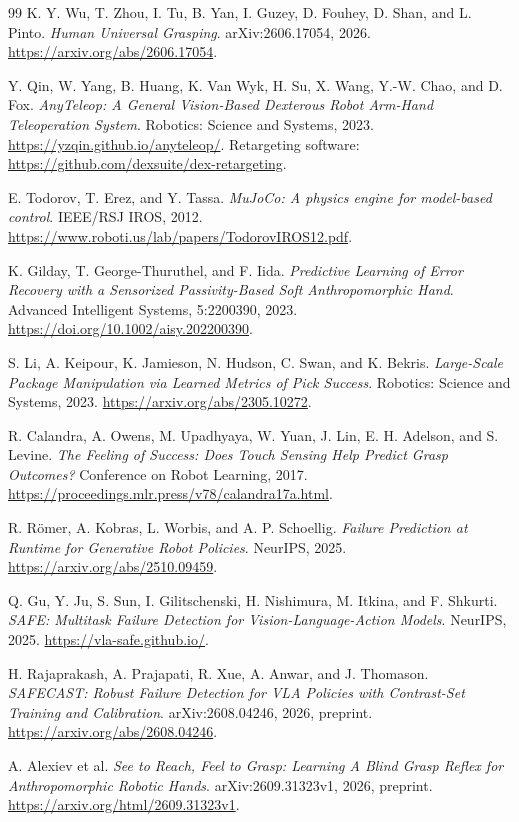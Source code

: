 \documentclass[10pt,letterpaper]{article}
\begin{document}
\begin{thebibliography}{99}
K. Y. Wu, T. Zhou, I. Tu, B. Yan, I. Guzey, D. Fouhey, D. Shan, and L. Pinto.
\emph{Human Universal Grasping}. arXiv:2606.17054, 2026.
\url{https://arxiv.org/abs/2606.17054}.

Y. Qin, W. Yang, B. Huang, K. Van Wyk, H. Su, X. Wang, Y.-W. Chao, and D. Fox.
\emph{AnyTeleop: A General Vision-Based Dexterous Robot Arm-Hand Teleoperation
System}. Robotics: Science and Systems, 2023.
\url{https://yzqin.github.io/anyteleop/}. Retargeting software:
\url{https://github.com/dexsuite/dex-retargeting}.

E. Todorov, T. Erez, and Y. Tassa.
\emph{MuJoCo: A physics engine for model-based control}. IEEE/RSJ IROS, 2012.
\url{https://www.roboti.us/lab/papers/TodorovIROS12.pdf}.

K. Gilday, T. George-Thuruthel, and F. Iida.
\emph{Predictive Learning of Error Recovery with a Sensorized Passivity-Based
Soft Anthropomorphic Hand}. Advanced Intelligent Systems, 5:2200390, 2023.
\url{https://doi.org/10.1002/aisy.202200390}.

S. Li, A. Keipour, K. Jamieson, N. Hudson, C. Swan, and K. Bekris.
\emph{Large-Scale Package Manipulation via Learned Metrics of Pick Success}.
Robotics: Science and Systems, 2023.
\url{https://arxiv.org/abs/2305.10272}.

R. Calandra, A. Owens, M. Upadhyaya, W. Yuan, J. Lin, E. H. Adelson, and S. Levine.
\emph{The Feeling of Success: Does Touch Sensing Help Predict Grasp Outcomes?}
Conference on Robot Learning, 2017.
\url{https://proceedings.mlr.press/v78/calandra17a.html}.

R. R\"omer, A. Kobras, L. Worbis, and A. P. Schoellig.
\emph{Failure Prediction at Runtime for Generative Robot Policies}.
NeurIPS, 2025. \url{https://arxiv.org/abs/2510.09459}.

Q. Gu, Y. Ju, S. Sun, I. Gilitschenski, H. Nishimura, M. Itkina, and F. Shkurti.
\emph{SAFE: Multitask Failure Detection for Vision-Language-Action Models}.
NeurIPS, 2025. \url{https://vla-safe.github.io/}.

H. Rajaprakash, A. Prajapati, R. Xue, A. Anwar, and J. Thomason.
\emph{SAFECAST: Robust Failure Detection for VLA Policies with Contrast-Set
Training and Calibration}. arXiv:2608.04246, 2026, preprint.
\url{https://arxiv.org/abs/2608.04246}.

A. Alexiev et al.
\emph{See to Reach, Feel to Grasp: Learning A Blind Grasp Reflex for
Anthropomorphic Robotic Hands}.
arXiv:2609.31323v1, 2026, preprint.
\url{https://arxiv.org/html/2609.31323v1}.
\end{thebibliography}
\end{document}
